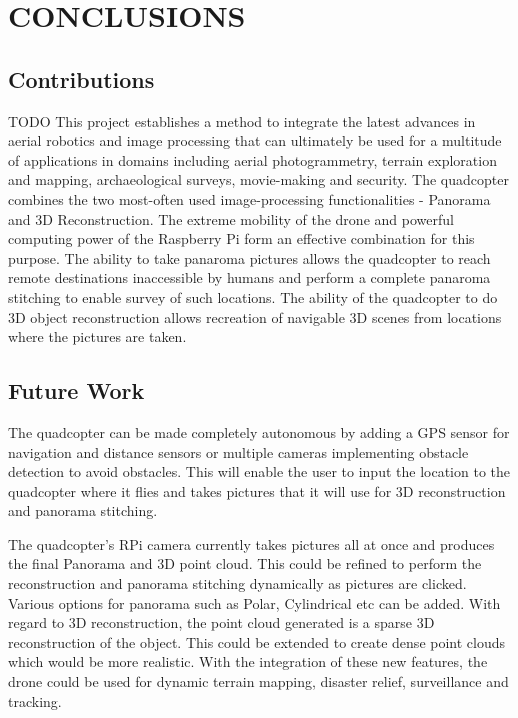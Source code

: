 
\chapter{CONCLUSIONS} %
\section{Contributions}
TODO
This project establishes a method to integrate the latest advances in aerial robotics and image processing that can ultimately be used for a multitude of applications in domains including aerial photogrammetry, terrain exploration and mapping, archaeological surveys, movie-making and security. The quadcopter combines the two most-often used image-processing functionalities - Panorama and 3D Reconstruction. The extreme mobility of the drone and powerful computing power of the Raspberry Pi form an effective combination for this purpose.
The ability to take panaroma pictures allows the quadcopter to reach remote destinations inaccessible by humans and perform a complete panaroma stitching to enable survey of such locations.
The ability of the quadcopter to do 3D object reconstruction allows recreation of navigable 3D scenes from locations where the pictures are taken.
\section{Future Work}
The quadcopter can be made completely autonomous by adding a GPS sensor for navigation and distance sensors or multiple cameras implementing obstacle detection to avoid obstacles. This will enable the user to input the location to the quadcopter where it flies and takes pictures that it will use for 3D reconstruction and panorama stitching.

The quadcopter's RPi camera currently takes pictures all at once and produces the final Panorama and 3D point cloud. This could be refined to perform the reconstruction and panorama stitching dynamically as pictures are clicked. Various options for panorama such as Polar, Cylindrical etc can be added. With regard to 3D reconstruction, the point cloud generated is a sparse 3D reconstruction of the object. This could be extended to create dense point clouds which would be more realistic.
With the integration of these new features, the drone could be used for dynamic terrain mapping, disaster relief, surveillance and tracking.